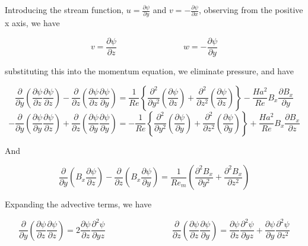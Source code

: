 \documentclass[11pt]{article}
\begin{document}
Introducing the stream function, $u = \frac{\partial \psi}{\partial y}$ and $v = - \frac{\partial \psi}{\partial x}$, observing from the positive x axis, we have

\begin{equation}
	v = \frac{\partial \psi}{\partial z}
	\qquad \qquad \qquad \qquad
	w = - \frac{\partial \psi}{\partial y}
\end{equation}

substituting this into the momentum equation, we eliminate pressure, and have

\begin{equation}
	\frac{\partial}{\partial y}
	\left(
	\frac{\partial \psi}{\partial z}
	\frac{\partial \psi}{\partial z}
	\right)
	-
	\frac{\partial}{\partial z}
	\left(
	\frac{\partial \psi}{\partial z}
	\frac{\partial \psi}{\partial y}
	\right)
	= 
	\frac{1}{Re}
	\left\{
	\frac{\partial^2}{\partial y^2}
	\left(
	\frac{\partial \psi}{\partial z}
	\right)
	+
	\frac{\partial^2}{\partial z^2}
	\left(
	\frac{\partial \psi}{\partial z}
	\right)
	\right\}
	- 
	\frac{Ha^2}{Re}
	B_x
	\frac{\partial B_x}{\partial y} 
\end{equation}
\begin{equation}
	-\frac{\partial}{\partial y}
	\left(
	\frac{\partial \psi}{\partial y}
	\frac{\partial \psi}{\partial z}
	\right)
	+ \frac{\partial}{\partial z}
	\left(
	\frac{\partial \psi}{\partial y}
	\frac{\partial \psi}{\partial y}
	\right)
	= 
	- \frac{1}{Re}
	\left\{
	\frac{\partial^2}{\partial y^2}
	\left(
	\frac{\partial \psi}{\partial y}
	\right)
	+\frac{\partial^2}{\partial z^2}
	\left(
	\frac{\partial \psi}{\partial y}
	\right)
	\right\}
	+ \frac{Ha^2}{Re}
	B_x
	\frac{\partial B_x}{\partial z} 
\end{equation}

And

\begin{equation}
	\frac{\partial}{\partial y} \left( B_x \frac{\partial \psi}{\partial z} \right)
	- \frac{\partial}{\partial z} \left( B_x \frac{\partial \psi}{\partial y} \right)
	=
	\frac{1}{Re_m}
	\left(
	\frac{\partial^2 B_x}{\partial y^2}
	+ \frac{\partial^2 B_x}{\partial z^2}
	\right)
\end{equation}

Expanding the advective terms, we have

\begin{equation}
	\frac{\partial}{\partial y}
	\left(
	\frac{\partial \psi}{\partial z}
	\frac{\partial \psi}{\partial z}
	\right)
	=
	2
	\frac{\partial \psi }{\partial z}
	\frac{\partial^2 \psi}{\partial yz}
	\qquad \qquad
	\qquad \qquad
	\frac{\partial}{\partial z}
	\left(
	\frac{\partial \psi}{\partial z}
	\frac{\partial \psi}{\partial y}
	\right)
	=
	\frac{\partial \psi}{\partial z}
	\frac{\partial^2 \psi}{\partial yz} +
	\frac{\partial \psi}{\partial y}
	\frac{\partial^2 \psi}{\partial z^2}
\end{equation}
\end{document}
